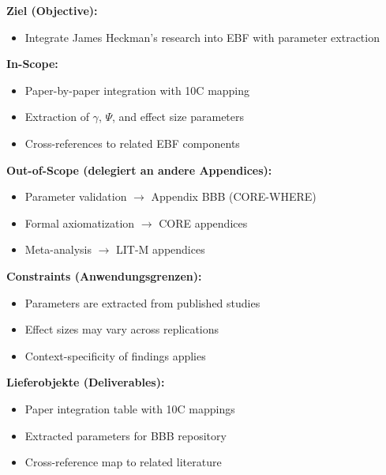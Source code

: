 
\begin{tcolorbox}[
    colback=orange!5!white,
    colframe=orange!75!black,
    title={\textbf{Appendix Scope: Ziel / In-Scope / Out-of-Scope / Constraints}},
    fonttitle=\bfseries
]

\textbf{Ziel (Objective):}
\begin{itemize}[nosep]
    \item Integrate James Heckman's research into EBF with parameter extraction
\end{itemize}

\textbf{In-Scope:}
\begin{itemize}[nosep]
    \item Paper-by-paper integration with 10C mapping
    \item Extraction of $\gamma$, $\Psi$, and effect size parameters
    \item Cross-references to related EBF components
\end{itemize}

\textbf{Out-of-Scope (delegiert an andere Appendices):}
\begin{itemize}[nosep]
    \item Parameter validation $\rightarrow$ Appendix BBB (CORE-WHERE)
    \item Formal axiomatization $\rightarrow$ CORE appendices
    \item Meta-analysis $\rightarrow$ LIT-M appendices
\end{itemize}

\textbf{Constraints (Anwendungsgrenzen):}
\begin{itemize}[nosep]
    \item Parameters are extracted from published studies
    \item Effect sizes may vary across replications
    \item Context-specificity of findings applies
\end{itemize}

\textbf{Lieferobjekte (Deliverables):}
\begin{itemize}[nosep]
    \item Paper integration table with 10C mappings
    \item Extracted parameters for BBB repository
    \item Cross-reference map to related literature
\end{itemize}

\end{tcolorbox}

